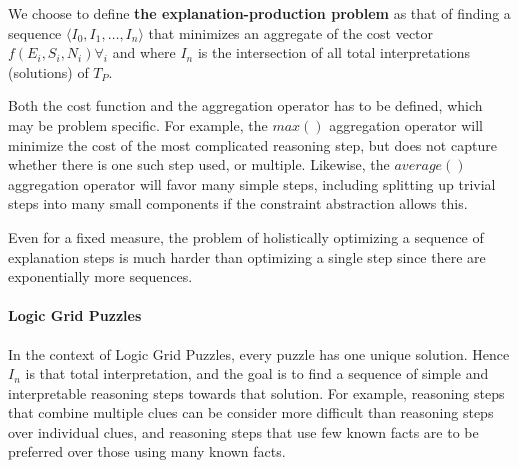We choose to define \textbf{the explanation-production problem} as that of finding a sequence $\langle I_0, I_1, \ldots, I_n \rangle$ that minimizes an aggregate of the cost vector $f(E_i,S_i,N_i) \forall_i$ and where $I_n$ is the intersection of all total interpretations (solutions) of $T_P$. 


Both the cost function and the aggregation operator has to be defined, which may be problem specific. For example, the $max()$ aggregation operator will minimize the cost of the most complicated reasoning step, but does not capture whether there is one such step used, or multiple. Likewise, the $average()$ aggregation operator will favor many simple steps, including splitting up trivial steps into many small components if the constraint abstraction allows this.


Even for a fixed measure, the problem of holistically optimizing a sequence of explanation steps is much harder than optimizing a single step since there are exponentially more sequences. 
 


\paragraph{Logic Grid Puzzles} In the context of Logic Grid Puzzles, every puzzle has one unique solution. Hence $I_n$ is that total interpretation, and the goal is to find a sequence of simple and interpretable reasoning steps towards that solution. For example, reasoning steps that combine multiple clues can be consider more difficult than reasoning steps over individual clues, and reasoning steps that use few known facts are to be preferred over those using many known facts.




